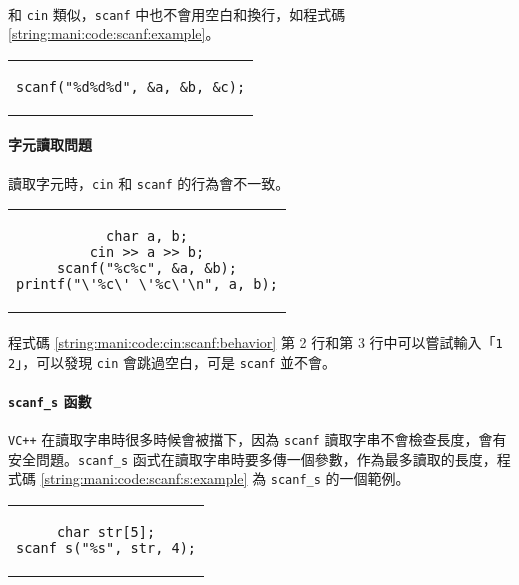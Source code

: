 \documentclass[12pt,a4paper,oneside]{report}
\begin{document}
\begin{CJK}{UTF8}{bkai}
\paragraph{}和 \lstinline!cin! 類似，\lstinline!scanf! 中也不會用空白和換行，如程式碼 \ref{string:mani:code:scanf:example}。

\begin{code}[h!]
  \centering
  \begin{tabular}{c}
  \begin{lstlisting}
scanf("%d%d%d", &a, &b, &c);
  \end{lstlisting}
  \end{tabular}
  \caption{\lstinline!scanf! 範例}
  \label{string:mani:code:scanf:example}
\end{code}

\paragraph{字元讀取問題}讀取字元時，\lstinline!cin! 和 \lstinline!scanf! 的行為會不一致。

\begin{code}[h!]
  \centering
  \begin{tabular}{c}
  \begin{lstlisting}
char a, b;
cin >> a >> b;
scanf("%c%c", &a, &b);
printf("\'%c\' \'%c\'\n", a, b);
  \end{lstlisting}
  \end{tabular}
  \caption{\lstinline!cin! 和 \lstinline!scanf! 行為不一致}
  \label{string:mani:code:cin:scanf:behavior}
\end{code}

\paragraph{}程式碼 \ref{string:mani:code:cin:scanf:behavior} 第 2 行和第 3 行中可以嘗試輸入「\lstinline!1 2!」，可以發現 \lstinline!cin! 會跳過空白，可是 \lstinline!scanf! 並不會。
\paragraph{\lstinline!scanf_s! 函數}\texttt{VC++} 在讀取字串時很多時候會被擋下，因為 \lstinline!scanf! 讀取字串不會檢查長度，會有安全問題。\lstinline!scanf_s! 函式在讀取字串時要多傳一個參數，作為最多讀取的長度，程式碼 \ref{string:mani:code:scanf:s:example} 為 \lstinline!scanf_s! 的一個範例。

\begin{code}[h!]
  \centering
  \begin{tabular}{c}
  \begin{lstlisting}
char str[5];
scanf_s("%s", str, 4);
  \end{lstlisting}
  \end{tabular}
  \caption{\lstinline!scanf_s! 的範例}
  \label{string:mani:code:scanf:s:example}
\end{code}


\end{CJK}
\end{document}
